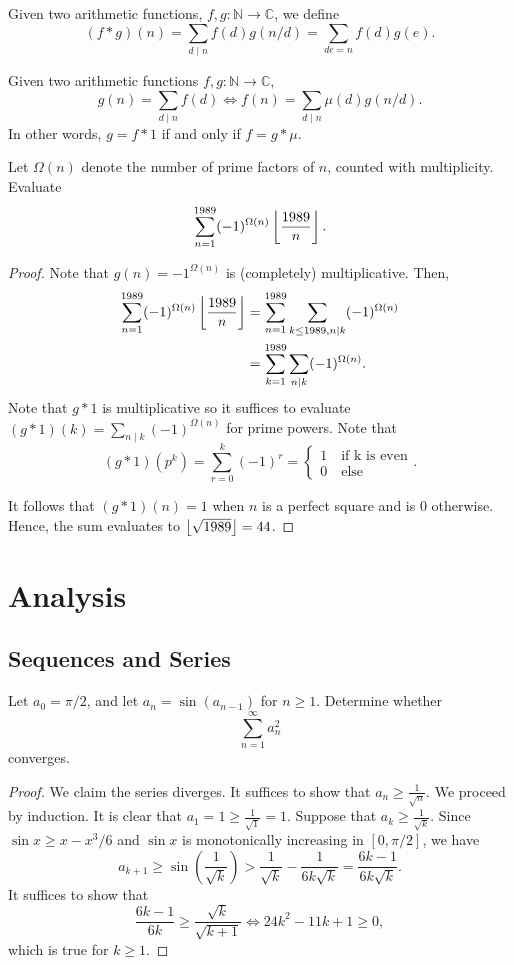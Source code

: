 \documentclass[11pt]{article}
\newcommand{\N}{\mathbb{N}}
\newcommand{\C}{\mathbb C}
\renewcommand{\>}{\rangle}
\newcommand{\<}{\langle}
\begin{document}
\begin{definition} Given two arithmetic functions, $f, g: \N \to \C$, we define 
$$(f * g)(n) = \sum_{d \mid n} f(d) g(n/d) = \sum_{de = n} f(d) g(e).$$
\end{definition}

\begin{theorem} Given two arithmetic functions $f, g: \N \to \C$, 
$$g(n) = \sum_{d \mid n} f(d) \Longleftrightarrow f(n) = \sum_{d  \mid n} \mu(d) g(n/d).$$
In other words, $g = f * 1$ if and only if $f = g * \mu$.
\end{theorem}

\begin{problem}[Bulgaria 1989] Let $\Omega(n)$ denote the number of prime factors of $n$, counted with multiplicity.  Evaluate 
$$\sum_{n=1}^{1989} (-1)^{\Omega(n)} \left\lfloor \frac{1989}{n} \right\rfloor.$$
\end{problem}
\begin{proof}
Note that $g(n) = -1^{\Omega(n)}$ is (completely) multiplicative.  Then,
\begin{align*}
\sum_{n=1}^{1989} (-1)^{\Omega(n)} \left\lfloor \frac{1989}{n} \right\rfloor &= \sum_{n=1}^{1989} \sum_{k \le 1989, n \mid k}  (-1)^{\Omega(n)} \\
&= \sum_{k=1}^{1989} \sum_{n \mid k} (-1)^{\Omega(n)}.
\end{align*}
Note that $g * 1$ is multiplicative so it suffices to evaluate $(g * 1)(k) = \sum_{n \mid k} (-1)^{\Omega(n)}$ for prime powers.  Note that 
$$(g*1)(p^k) = \sum_{r=0}^k (-1)^{r} = \begin{cases}
1 \quad \text{if k is even}\\
0 \quad \text{else}
\end{cases}.$$

It follows that $(g*1)(n) = 1$ when $n$ is a perfect square and is $0$ otherwise.  Hence, the sum evaluates to $\left\lfloor \sqrt{1989} \right\rfloor = 44$.
\end{proof} 
\pagebreak
\section{Analysis}
\subsection{Sequences and Series}
\begin{problem}[Putnam 2020/A3] 	Let $a_0=\pi /2$, and let $a_n=\sin (a_{n-1})$ for $n\ge 1$. Determine whether
\[ \sum_{n=1}^{\infty}a_n^2 \]converges.
\end{problem}
\begin{proof}
We claim the series diverges.   It suffices to show that $a_n \ge \frac{1}{\sqrt{n}}$. We proceed by induction.  It is clear that $a_1 = 1 \ge \frac{1}{\sqrt{1}} = 1$.  Suppose that $a_k \ge \frac{1}{\sqrt{k}}$.  Since $\sin x \ge x - x^3 / 6$ and $\sin x$ is monotonically increasing in $[0, \pi/2]$, we have 
$$a_{k + 1} \ge \sin \left (\frac{1}{\sqrt{k}} \right) > \frac{1}{\sqrt{k}} - \frac{1}{6k\sqrt{k}} = \frac{6k-1}{6k\sqrt{k}}.$$
It suffices to show that 
$$\frac{6k-1}{6k} \ge \frac{\sqrt{k}}{\sqrt{k + 1}} \Leftrightarrow 24k^2 - 11k + 1 \ge 0,$$
which is true for $k \ge 1$.
\end{proof}
\end{document}
